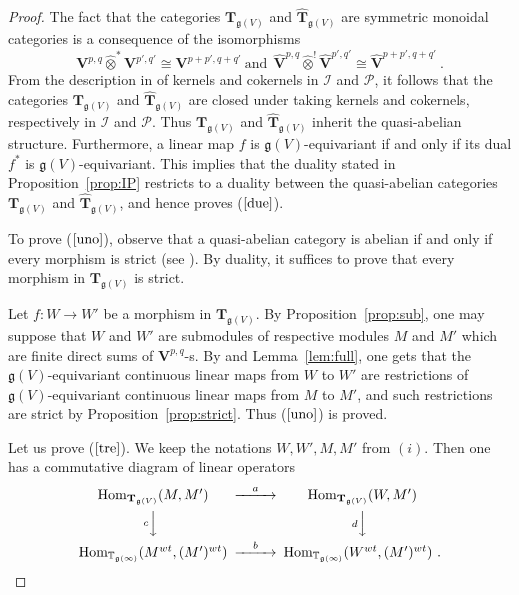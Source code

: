 \documentclass[12pt,reqno]{amsart}
\newcommand{\Hom}{\mathrm{Hom}}
\theoremstyle{definition}
\theoremstyle{remark}
\begin{document}
        \begin{proof}
        The fact that the categories $\mathbf{T}_{\mathfrak{g}(V)}$ and $\widehat{{\mathbf T}}_{\mathfrak{g}(V)}$ are symmetric monoidal categories is a consequence of the isomorphisms 
        \[
        \mathbf{V}^{p,q}\widehat{\otimes}^\ast \mathbf{V}^{p',q'} \cong \mathbf{V}^{p+p',q+q'} \ \mathrm{and}\ \ \widehat{\mathbf{V}}^{p,q}\widehat{\otimes}^! \widehat{\mathbf{V}}^{p',q'} \cong \widehat{\mathbf{V}}^{p+p',q+q'} \ .
        \]
            From the description in \cite[Prop.~2.9]{EP} of kernels and cokernels in $\mathcal{I}$ and $\mathcal{P}$, it follows that the categories $\mathbf{T}_{\mathfrak{g}(V)}$ and $\widehat{{\mathbf T}}_{\mathfrak{g}(V)}$ are closed under taking kernels and cokernels, respectively in $\mathcal{I}$ and $\mathcal{P}$. Thus $\mathbf{T}_{\mathfrak{g}(V)}$ and $\widehat{{\mathbf T}}_{\mathfrak{g}(V)}$ inherit the quasi-abelian structure.
	Furthermore, a linear map $f$ is $\mathfrak{g}(V)$-equivariant if and only if its dual $f^\ast$ is $\mathfrak{g}(V)$-equivariant. This implies that the duality stated in Proposition~\ref{prop:IP} restricts to a duality between the quasi-abelian categories $\mathbf{T}_{\mathfrak{g}(V)}$ and $\widehat{{\mathbf T}}_{\mathfrak{g}(V)}$, and hence proves 
	($\ref{due}$).
	
	To prove ($\ref{uno}$), observe that a quasi-abelian category is abelian if and only if every morphism is strict (see \cite[Remark~4.7 and Remark~4.9]{Buh}). By duality, it suffices to prove that every morphism in $\mathbf{T}_{\mathfrak{g}(V)}$ is strict. 
	
	Let $f:W\rightarrow W'$ be a morphism in $\mathbf{T}_{\mathfrak{g}(V)}$. By Proposition~\ref{prop:sub}, one may suppose that $W$ and $W'$ are submodules of respective modules $M$ and $M'$ which are finite direct sums of $\mathbf{V}^{p,q}$-s. By \cite[Proposition~4.5]{DPS} and Lemma~\ref{lem:full}, one gets that the $\mathfrak{g}(V)$-equivariant continuous linear maps from $W$ to $W'$ are restrictions of $\mathfrak{g}(V)$-equivariant continuous linear maps from $M$ to $M'$, and such restrictions are strict by Proposition~\ref{prop:strict}. Thus ($\ref{uno}$) is proved.
	
	Let us prove ($\ref{tre}$). We keep the notations $W, W', M, M'$ from $(i)$. Then one has a commutative diagram of linear operators
	\[
 \begin{CD}
	\Hom_{\mathbf{T}_{\mathfrak{g}(V)}}(M, M')@>{a}>> \Hom_{\mathbf{T}_{\mathfrak{g}(V)}}(W, M') \\
	@V{c}VV @V{d}VV \\
	\Hom_{\mathbb{T}_{\mathfrak{g}(\infty)}}(M^{wt}, (M')^{wt})@>{b}>> \Hom_{\mathbb{T}_{\mathfrak{g}(\infty)}}(W^{wt}, (M')^{wt}) \ .
	\end{CD} 
    \]
	

\end{proof}
\end{document}
